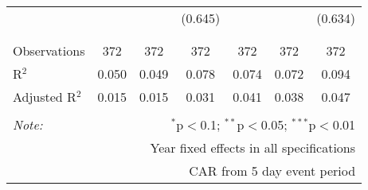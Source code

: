 \begin{table}[!htbp]
\begin{tabular}{@{\extracolsep{5pt}}lcccccc}
  &  &  & (0.645) &  &  & (0.634) \\ 
  & & & & & & \\ 
\hline \\[-1.8ex] 
Observations & 372 & 372 & 372 & 372 & 372 & 372 \\ 
R$^{2}$ & 0.050 & 0.049 & 0.078 & 0.074 & 0.072 & 0.094 \\ 
Adjusted R$^{2}$ & 0.015 & 0.015 & 0.031 & 0.041 & 0.038 & 0.047 \\ 
\hline 
\hline \\[-1.8ex] 
\textit{Note:}  & \multicolumn{6}{r}{$^{*}$p$<$0.1; $^{**}$p$<$0.05; $^{***}$p$<$0.01} \\ 
 & \multicolumn{6}{r}{Year fixed effects in all specifications} \\ 
 & \multicolumn{6}{r}{CAR from 5 day event period} \\ 
\end{tabular} 
\end{table} 
